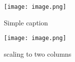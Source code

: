 
\begin{figure}[h]
	\centering
		\texttt{[image: image.png]}
	\caption{Simple caption}
	\label{FIG:2}
\end{figure}


\begin{figure*}[!b]
    \centering
    \texttt{[image: image.png]}
    \caption{scaling to two columns}
\end{figure*}